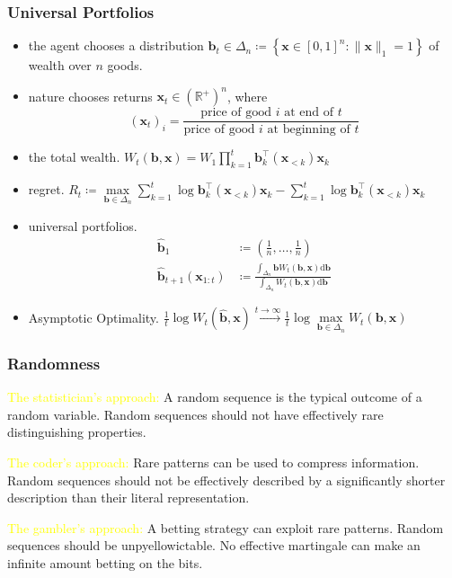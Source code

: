 \documentclass[UTF8,11pt,colorlinks,compress,openany]{beamer}%
\begin{document}
\begin{frame}\frametitle{Universal Portfolios}
	\begin{itemize}
		\item the agent chooses a distribution $\mathbf{b}_t\in\Delta_n\coloneqq \left\{\mathbf{x}\in[0,1]^n:\|\mathbf{x}\|_1=1\right\}$ of wealth over $n$ goods.
		\item nature chooses returns $\mathbf{x}_t\in(\mathbb{R}^+)^n$, where \[(\mathbf{x}_t)_i=\frac{\text{price of good $i$ at end of $t$}}{\text{price of good $i$ at beginning of $t$}}\]
		\item the total wealth.
		$W_t(\mathbf{b},\mathbf{x})=W_1\prod\limits_{k=1}^t\mathbf{b}_k^\top(\mathbf{x}_{<k})\mathbf{x}_k$
		\item regret.
		$R_t\coloneqq \max\limits_{\mathbf{b}\in\Delta_n}\sum\limits_{k=1}^t\log \mathbf{b}_k^\top(\mathbf{x}_{<k})\mathbf{x}_k-\sum\limits_{k=1}^t\log \mathbf{b}_k^\top(\mathbf{x}_{<k})\mathbf{x}_k$
		\item universal portfolios.
		\begin{align*}
		\hat{\mathbf{b}}_1&\coloneqq \left(\tfrac{1}{n},\dots,\tfrac{1}{n}\right)\\
		\hat{\mathbf{b}}_{t+1}(\mathbf{x}_{1:t})&\coloneqq \frac{\int_{\Delta_n}\!\!\mathbf{b} W_t(\mathbf{b},\mathbf{x})\mathrm{d}\mathbf{b}}{\int_{\Delta_n}\!\!W_t(\mathbf{b},\mathbf{x})\mathrm{d}\mathbf{b}}
		\end{align*}
		\item Asymptotic Optimality.
		$\frac{1}{t}\log W_t(\hat{\mathbf{b}},\mathbf{x})\xrightarrow{t\to\infty}\frac{1}{t}\log \max\limits_{\mathbf{b}\in\Delta_n}W_t(\mathbf{b},\mathbf{x})$
	\end{itemize}
\end{frame}

\begin{frame}\frametitle{Randomness}
\begin{description}
	\item[\textcolor{green}{Typicalness}] \textcolor{yellow}{The statistician's approach:} A random sequence is the typical outcome of a random variable. Random sequences should not have effectively rare distinguishing properties.
	\item[\textcolor{green}{Incompressibility}] \textcolor{yellow}{The coder's approach:} Rare patterns can be used to compress information. Random sequences should not be effectively described by a significantly shorter description than their literal representation.
	\item[\textcolor{green}{Unpredictability}] \textcolor{yellow}{The gambler's approach:} A betting strategy can exploit rare patterns. Random sequences should be unpyellowictable. No effective martingale can make an infinite amount betting on the bits.
\end{description}
\end{frame}
\end{document}
